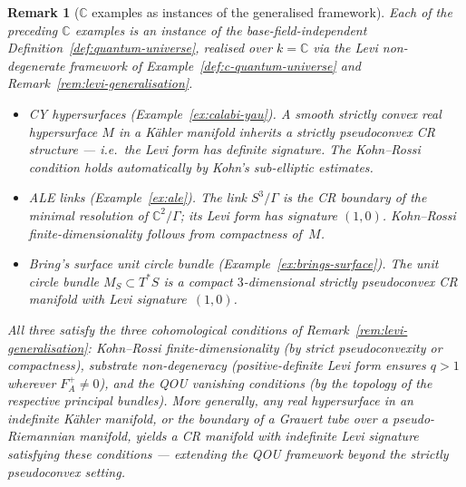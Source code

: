 \documentclass[12pt,a4paper]{report}
\newtheorem{remark}[theorem]{Remark}
\begin{document}
\begin{remark}[$\mathbb{C}$ examples as instances of the generalised framework]
\label{rem:examples-unified}
Each of the preceding $\mathbb{C}$ examples is an instance of the
base-field-independent Definition~\ref{def:quantum-universe}, realised
over $k = \mathbb{C}$ via the Levi non-degenerate framework of
Example~\ref{def:c-quantum-universe} and
Remark~\ref{rem:levi-generalisation}.
\begin{itemize}
  \item \emph{CY hypersurfaces} (Example~\ref{ex:calabi-yau}).  A smooth
        strictly convex real hypersurface $M$ in a K\"ahler manifold inherits
        a strictly pseudoconvex CR structure --- i.e.\ the Levi form has
        definite signature.
        The Kohn--Rossi condition holds automatically by Kohn's sub-elliptic
        estimates.
  \item \emph{ALE links} (Example~\ref{ex:ale}).  The link
        $S^3/\Gamma$ is the CR boundary of the minimal resolution of
        $\mathbb{C}^2/\Gamma$; its Levi form has signature $(1,0)$.
        Kohn--Rossi finite-dimensionality follows from compactness of~$M$.
  \item \emph{Bring's surface unit circle bundle}
        (Example~\ref{ex:brings-surface}).  The unit circle bundle
        $M_S \subset T^*S$ is a compact $3$-dimensional strictly
        pseudoconvex CR manifold with Levi signature~$(1,0)$.
\end{itemize}
All three satisfy the three cohomological conditions of
Remark~\ref{rem:levi-generalisation}: Kohn--Rossi
finite-dimensionality (by strict pseudoconvexity or compactness),
substrate non-degeneracy (positive-definite Levi form ensures
$q > 1$ wherever $F_A^+ \neq 0$), and the QOU vanishing conditions
(by the topology of the respective principal bundles).  More generally,
any real hypersurface in an indefinite K\"ahler manifold, or the boundary
of a Grauert tube over a pseudo-Riemannian manifold, yields a CR manifold
with indefinite Levi signature satisfying these conditions --- extending
the QOU framework beyond the strictly pseudoconvex setting.
\end{remark}
\end{document}
